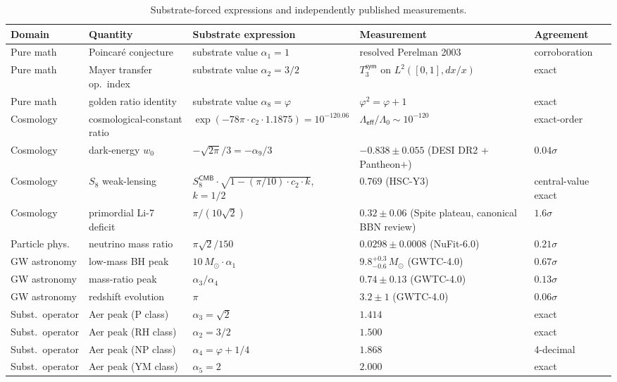 \documentclass[11pt,a4paper]{amsart}
\theoremstyle{plain}
\theoremstyle{definition}
\begin{document}
\begin{table}[h]
\centering
\caption{Substrate-forced expressions and independently published measurements.}\label{tab:appearances}
\footnotesize
\begin{tabular}{p{1.6cm} p{2.6cm} p{4.5cm} p{2.9cm} p{1.7cm}}
\toprule
Domain & Quantity & Substrate expression & Measurement & Agreement \\
\midrule
Pure math & Poincar\'e conjecture & substrate value $\alpha_1 = 1$ & resolved Perelman 2003 & corroboration \\
Pure math & Mayer transfer op.\ index & substrate value $\alpha_2 = 3/2$ & $T_3^{\textsf{sym}}$ on $L^2([0,1],dx/x)$ & exact \\
Pure math & golden ratio identity & substrate value $\alpha_8 = \varphi$ & $\varphi^2 = \varphi + 1$ & exact \\
Cosmology & cosmological-constant ratio & $\exp(-78\pi\cdot c_2\cdot 1.1875) = 10^{-120.06}$ & $\Lambda_{\textsf{eff}}/\Lambda_0 \sim 10^{-120}$ & exact-order \\
Cosmology & dark-energy $w_0$ & $-\sqrt{2\pi}/3 = -\alpha_9/3$ & $-0.838 \pm 0.055$ (DESI DR2 + Pantheon$+$) & $0.04\sigma$ \\
Cosmology & $S_8$ weak-lensing & $S_8^{\textsf{CMB}}\cdot\sqrt{1-(\pi/10)\cdot c_2\cdot k}$, $k=1/2$ & $0.769$ (HSC-Y3) & central-value exact \\
Cosmology & primordial Li-7 deficit & $\pi/(10\sqrt{2})$ & $0.32 \pm 0.06$ (Spite plateau, canonical BBN review) & $1.6\sigma$ \\
Particle phys.\ & neutrino mass ratio & $\pi\sqrt{2}/150$ & $0.0298 \pm 0.0008$ (NuFit-6.0) & $0.21\sigma$ \\
GW astronomy & low-mass BH peak & $10\,M_\odot \cdot \alpha_1$ & $9.8^{+0.3}_{-0.6}\,M_\odot$ (GWTC-4.0) & $0.67\sigma$ \\
GW astronomy & mass-ratio peak & $\alpha_3/\alpha_4$ & $0.74 \pm 0.13$ (GWTC-4.0) & $0.13\sigma$ \\
GW astronomy & redshift evolution & $\pi$ & $3.2 \pm 1$ (GWTC-4.0) & $0.06\sigma$ \\
Subst.\ operator & Aer peak (P class) & $\alpha_3 = \sqrt{2}$ & $1.414$ & exact \\
Subst.\ operator & Aer peak (RH class) & $\alpha_2 = 3/2$ & $1.500$ & exact \\
Subst.\ operator & Aer peak (NP class) & $\alpha_4 = \varphi+1/4$ & $1.868$ & 4-decimal \\
Subst.\ operator & Aer peak (YM class) & $\alpha_5 = 2$ & $2.000$ & exact \\
\bottomrule
\end{tabular}
\end{table}
\end{document}
